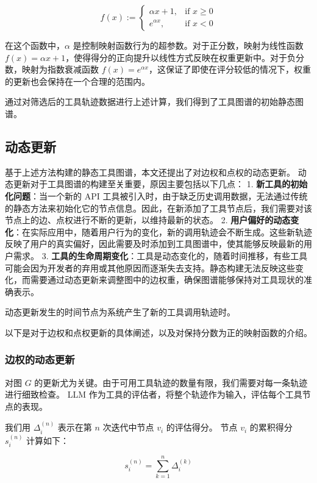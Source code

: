\[
f(x) :=
\begin{cases}
\alpha x + 1, & \text{if } x \geq 0 \\
e^{\alpha x}, & \text{if } x < 0
\end{cases}
\]

在这个函数中，$\alpha$ 是控制映射函数行为的超参数。对于正分数，映射为线性函数 $f(x) = \alpha x + 1$，使得得分的正向提升以线性方式反映在权重更新中。对于负分数，映射为指数衰减函数 $f(x) = e^{\alpha x}$，这保证了即使在评分较低的情况下，权重的更新也会保持在一个合理的范围内。

通过对筛选后的工具轨迹数据进行上述计算，我们得到了工具图谱的初始静态图谱。

\subsection{动态更新}

基于上述方法构建的静态工具图谱，本文还提出了对边权和点权的动态更新。
动态更新对于工具图谱的构建至关重要，原因主要包括以下几点：
1. \textbf{新工具的初始化问题}：当一个新的 API 工具被引入时，由于缺乏历史调用数据，无法通过传统的静态方法来初始化它的节点信息。因此，在新添加了工具节点后，我们需要对该节点上的边、点权进行不断的更新，以维持最新的状态。
2. \textbf{用户偏好的动态变化}：在实际应用中，随着用户行为的变化，新的调用轨迹会不断生成。这些新轨迹反映了用户的真实偏好，因此需要及时添加到工具图谱中，使其能够反映最新的用户需求。
3. \textbf{工具的生命周期变化}：工具是动态变化的，随着时间推移，有些工具可能会因为开发者的弃用或其他原因而逐渐失去支持。静态构建无法反映这些变化，而需要通过动态更新来调整图中的边权重，确保图谱能够保持对工具现状的准确表示。

动态更新发生的时间节点为系统产生了新的工具调用轨迹时。

以下是对于边权和点权更新的具体阐述，以及对保持分数为正的映射函数的介绍。

\subsubsection{边权的动态更新}

对图 \( G \) 的更新尤为关键。由于可用工具轨迹的数量有限，我们需要对每一条轨迹进行细致检查。
LLM 作为工具的评估者，将整个轨迹作为输入，评估每个工具节点的表现。

我们用 \( \Delta_i^{(n)} \) 表示在第 \( n \) 次迭代中节点 \( v_i \) 的评估得分。
节点 \( v_i \) 的累积得分 \( s_i^{(n)} \) 计算如下：

\[
s_i^{(n)} = \sum_{k=1}^{n} \Delta_i^{(k)}
\]


